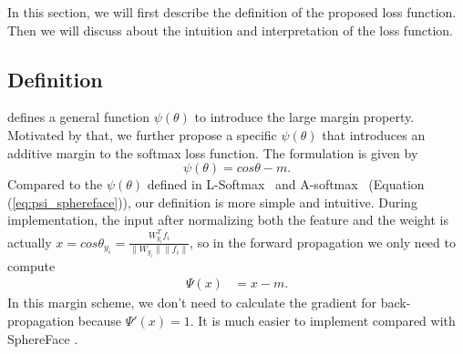 \documentclass[10pt,twocolumn,letterpaper]{article}
\begin{document}
In this section, we will first describe the definition of the proposed loss function. Then we will discuss about the intuition and interpretation of the loss function.

\subsection{Definition}

\cite{liu2016large} defines a general function $\psi(\theta)$ to introduce the large margin property. Motivated by that, we further propose a specific $\psi(\theta)$ that introduces an additive margin to the softmax loss function. The formulation is given by
\begin{equation}
\psi(\theta) = cos\theta - m.
\label{eq:psi_hardmargin}
\end{equation}
Compared to the $\psi(\theta)$ defined in L-Softmax~\cite{liu2016large} and A-softmax~\cite{liu2017sphereface} (Equation (\ref{eq:psi_sphereface})), our definition is more simple and intuitive. During implementation, the input after normalizing both the feature and the weight is actually $x = cos\theta_{y_i} = \frac{W_{y_i}^T f_i}{\|W_{y_i}\| \|f_i\|}$, so in the forward propagation we only need to compute
\begin{equation}
\begin{aligned}
\Psi(x) &= x - m.
\end{aligned}
\label{eq:psi_on_cos}
\end{equation}
In this margin scheme, we don't need to calculate the gradient for back-propagation because $\Psi'(x) = 1$. It is much easier to implement compared with SphereFace \cite{liu2017sphereface}.
\end{document}

